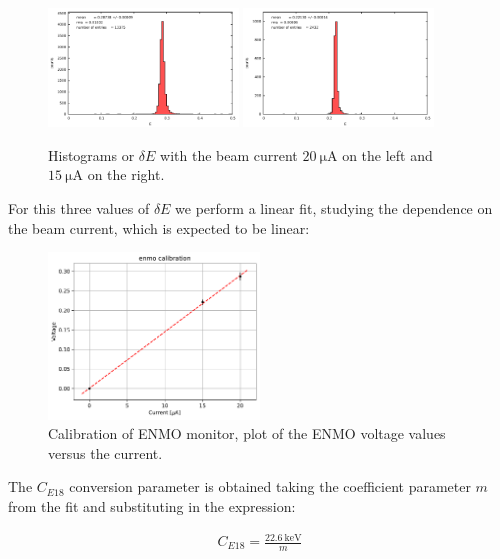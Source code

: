 \begin{figure}[!h]
\centering
\includegraphics[width = 0.45\textwidth]{Analysis/ENMOvoltage20.pdf}
\includegraphics[width = 0.45\textwidth]{Analysis/ENMOvoltage15.pdf} 
\caption{Histograms or $\delta E$ with the beam current $\SI{20}{\micro \ampere}$ on the left and $\SI{15}{\micro \ampere}$ on the right.}
\end{figure}

For this three values of $\delta E$ we perform a linear fit, studying the dependence on the beam current, which is expected to be linear:

\begin{figure}[!h]
\centering
\includegraphics[width = 0.5\textwidth]{Analysis/Calibrations/E18_Calibration.pdf}
\caption{Calibration of ENMO monitor, plot of the ENMO voltage values versus the current.}
\end{figure}

The $C_{E18}$ conversion parameter is obtained taking the coefficient parameter $m$ from the fit and substituting in the expression:

\begin{align*}
C_{E18} =  \frac{\SI{22.6}{\kilo \electronvolt}}{m}
\end{align*}

